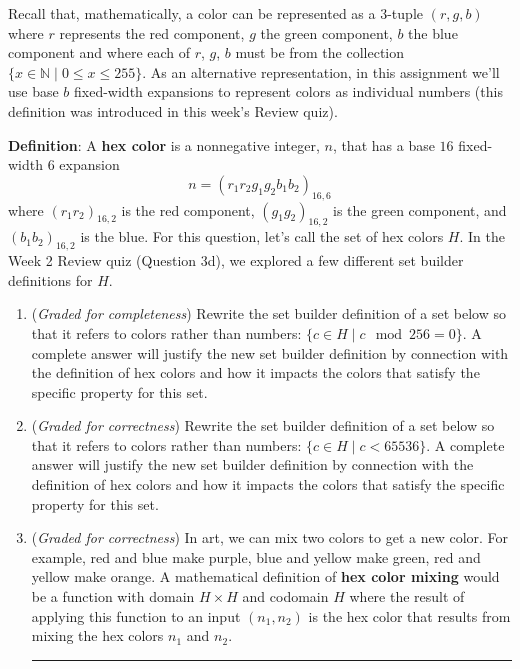 \documentclass[12pt, oneside]{article}
\newcommand{\gradeCorrect}{({\it Graded for correctness}) }
\newcommand{\gradeComplete}{({\it Graded for completeness}) }
\begin{document}
\begin{enumerate}[labelindent=0pt, leftmargin=0pt]
Recall that, mathematically, a color can be represented as a $3$-tuple $(r, g, b)$ 
where $r$ represents the red component, $g$ the green component, $b$ the blue component and where each of $r$, $g$, $b$ must be from the collection $\{x \in \mathbb{N}\mid 0 \leq x \leq 255 \}$.
As an alternative representation, in this assignment
we'll use base $b$ fixed-width expansions to represent colors
as individual numbers (this definition was introduced in this week's Review quiz).

{\bf Definition}: A {\bf hex color} is a nonnegative
integer, $n$, that has a base $16$ fixed-width $6$  expansion
$$n = (r_1r_2g_1g_2b_1b_2)_{16,6}$$ 
where $(r_1r_2)_{16,2}$ is the red
component, $(g_1g_2)_{16,2}$ is the green component, 
and $(b_1b_2)_{16,2}$ is the
blue. 
For this question, let's call the set of hex colors $H$. In the Week 2 Review quiz (Question 3d), 
we explored a few different set builder definitions for $H$.

\begin{enumerate}
\item \gradeComplete Rewrite the set builder definition of a set below so that it 
refers to colors rather than numbers: $\{ c \in H \mid c \mod 256 = 0\}$. A complete answer will 
justify the new set builder definition by connection with the definition of hex colors and how it impacts
the colors that satisfy the specific property for this set.
\item \gradeCorrect Rewrite the set builder definition of a set below so that it 
refers to colors rather than numbers: $\{ c \in H \mid c < 65536\}$. A complete answer will 
justify the new set builder definition by connection with the definition of hex colors and how it impacts
the colors that satisfy the specific property for this set.
\item \gradeCorrect In art, we can mix two colors to get a new color. For example, red and blue make 
purple, blue and yellow make green, red and yellow make orange. 
A mathematical definition of {\bf hex color mixing} would be a function with domain $H \times H$
and codomain $H$ where the result of applying this function to an input $(n_1, n_2)$ is the hex color
that results from mixing the hex colors $n_1$ and $n_2$.


\rule{0.5\textwidth}{.4pt}


\end{enumerate}
\end{enumerate}
\end{document}
